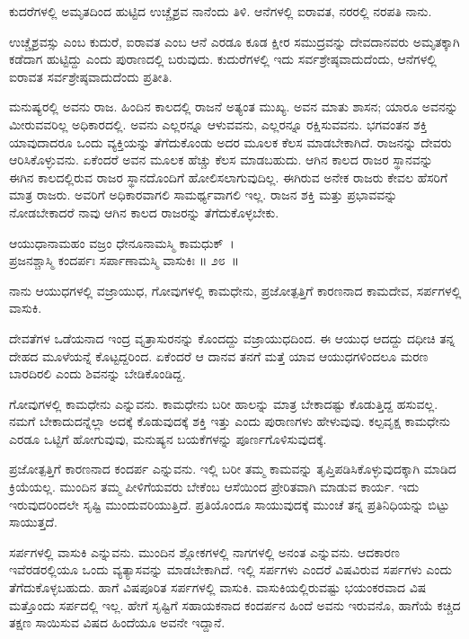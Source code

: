 \begin{artha}
ಕುದರೆಗಳಲ್ಲಿ ಅಮೃತದಿಂದ ಹುಟ್ಟಿದ ಉಚ್ಚೈಶ್ರವ ನಾನೆಂದು ತಿಳಿ. ಆನೆಗಳಲ್ಲಿ ಐರಾವತ, ನರರಲ್ಲಿ ನರಪತಿ ನಾನು.
\end{artha}

ಉಚ್ಚೈಶ್ರವಸ್ಸು ಎಂಬ ಕುದುರೆ, ಐರಾವತ ಎಂಬ ಆನೆ ಎರಡೂ ಕೂಡ ಕ್ಷೀರ ಸಮುದ್ರವನ್ನು ದೇವದಾನವರು ಅಮೃತಕ್ಕಾಗಿ ಕಡೆದಾಗ ಹುಟ್ಟಿದ್ದು ಎಂದು ಪುರಾಣದಲ್ಲಿ ಬರುವುದು. ಕುದುರೆಗಳಲ್ಲಿ ಇದು ಸರ್ವಶ್ರೇಷ್ಠವಾದುದೆಂದು, ಆನೆಗಳಲ್ಲಿ ಐರಾವತ ಸರ್ವಶ್ರೇಷ್ಠವಾದುದೆಂದು ಪ್ರತೀತಿ.

ಮನುಷ್ಯರಲ್ಲಿ ಅವನು ರಾಜ. ಹಿಂದಿನ ಕಾಲದಲ್ಲಿ ರಾಜನೆ ಅತ್ಯಂತ ಮುಖ್ಯ. ಅವನ ಮಾತು ಶಾಸನ; ಯಾರೂ ಅವನನ್ನು ಮೀರುವವರಿಲ್ಲ ಅಧಿಕಾರದಲ್ಲಿ. ಅವನು ಎಲ್ಲರನ್ನೂ ಆಳುವವನು, ಎಲ್ಲರನ್ನೂ ರಕ್ಷಿಸುವವನು. ಭಗವಂತನ ಶಕ್ತಿ ಯಾವುದಾದರೂ ಒಂದು ವ್ಯಕ್ತಿಯನ್ನು ತೆಗೆದುಕೊಂಡು ಅದರ ಮೂಲಕ ಕೆಲಸ ಮಾಡಬೇಕಾಗಿದೆ. ರಾಜನನ್ನು ದೇವರು ಆರಿಸಿಕೊಳ್ಳುವನು. ಏಕೆಂದರೆ ಅವನ ಮೂಲಕ ಹೆಚ್ಚು ಕೆಲಸ ಮಾಡಬಹುದು. ಆಗಿನ ಕಾಲದ ರಾಜರ ಸ್ಥಾನವನ್ನು ಈಗಿನ ಕಾಲದಲ್ಲಿರುವ ರಾಜರ ಸ್ಥಾನದೊಂದಿಗೆ ಹೋಲಿಸಲಾಗುವುದಿಲ್ಲ. ಈಗಿರುವ ಅನೇಕ ರಾಜರು ಕೇವಲ ಹೆಸರಿಗೆ ಮಾತ್ರ ರಾಜರು. ಅವರಿಗೆ ಅಧಿಕಾರವಾಗಲಿ ಸಾಮರ್ಥ್ಯವಾಗಲಿ ಇಲ್ಲ. ರಾಜನ ಶಕ್ತಿ ಮತ್ತು ಪ್ರಭಾವವನ್ನು ನೋಡಬೇಕಾದರೆ ನಾವು ಆಗಿನ ಕಾಲದ ರಾಜರನ್ನು ತೆಗೆದುಕೊಳ್ಳಬೇಕು.

\begin{shloka}
ಆಯುಧಾನಾಮಹಂ ವಜ್ರಂ ಧೇನೂನಾಮಸ್ಮಿ ಕಾಮಧುಕ್~।\\ಪ್ರಜನಶ್ಚಾಸ್ಮಿ ಕಂದರ್ಪಃ ಸರ್ಪಾಣಾಮಸ್ಮಿ ವಾಸುಕಿಃ \hfill॥ ೨೮~॥
\end{shloka}

\begin{artha}
ನಾನು ಆಯುಧಗಳಲ್ಲಿ ವಜ್ರಾಯುಧ, ಗೋವುಗಳಲ್ಲಿ ಕಾಮಧೇನು, ಪ್ರಜೋತ್ಪತ್ತಿಗೆ ಕಾರಣನಾದ ಕಾಮದೇವ, ಸರ್ಪಗಳಲ್ಲಿ ವಾಸುಕಿ.
\end{artha}

ದೇವತೆಗಳ ಒಡೆಯನಾದ ಇಂದ್ರ ವೃತ್ರಾಸುರನನ್ನು ಕೊಂದದ್ದು ವಜ್ರಾಯುಧದಿಂದ. ಈ ಆಯುಧ ಆದದ್ದು ದಧೀಚಿ ತನ್ನ ದೇಹದ ಮೂಳೆಯನ್ನೆ ಕೊಟ್ಟದ್ದರಿಂದ. ಏಕೆಂದರೆ ಆ ದಾನವ ತನಗೆ ಮತ್ತೆ ಯಾವ ಆಯುಧಗಳಿಂದಲೂ ಮರಣ ಬಾರದಿರಲಿ ಎಂದು ಶಿವನನ್ನು ಬೇಡಿಕೊಂಡಿದ್ದ.

ಗೋವುಗಳಲ್ಲಿ ಕಾಮಧೇನು ಎನ್ನುವನು. ಕಾಮಧೇನು ಬರೀ ಹಾಲನ್ನು ಮಾತ್ರ ಬೇಕಾದಷ್ಟು ಕೊಡುತ್ತಿದ್ದ ಹಸುವಲ್ಲ. ನಮಗೆ ಬೇಕಾದುದನ್ನೆಲ್ಲಾ ಅದಕ್ಕೆ ಕೊಡುವುದಕ್ಕೆ ಶಕ್ತಿ ಇತ್ತು ಎಂದು ಪುರಾಣಗಳು ಹೇಳುವುವು. ಕಲ್ಪವೃಕ್ಷ ಕಾಮಧೇನು ಎರಡೂ ಒಟ್ಟಿಗೆ ಹೋಗುವುವು, ಮನುಷ್ಯನ ಬಯಕೆಗಳನ್ನು ಪೂರ್ಣಗೊಳಿಸುವುದಕ್ಕೆ.

ಪ್ರಜೋತ್ಪತ್ತಿಗೆ ಕಾರಣನಾದ ಕಂದರ್ಪ ಎನ್ನುವನು. ಇಲ್ಲಿ ಬರೀ ತಮ್ಮ ಕಾಮವನ್ನು ತೃಪ್ತಿಪಡಿಸಿಕೊಳ್ಳುವುದಕ್ಕಾಗಿ ಮಾಡಿದ ಕ್ರಿಯೆಯಲ್ಲ. ಮುಂದಿನ ತಮ್ಮ ಪೀಳಿಗೆಯವರು ಬೇಕೆಂಬ ಆಸೆಯಿಂದ ಪ್ರೇರಿತವಾಗಿ ಮಾಡುವ ಕಾರ್ಯ. ಇದು ಇರುವುದರಿಂದಲೇ ಸೃಷ್ಟಿ ಮುಂದುವರಿ\-ಯುತ್ತಿದೆ. ಪ್ರತಿಯೊಂದೂ ಸಾಯುವುದಕ್ಕೆ ಮುಂಚೆ ತನ್ನ ಪ್ರತಿನಿಧಿಯನ್ನು ಬಿಟ್ಟು ಸಾಯುತ್ತದೆ.

ಸರ್ಪಗಳಲ್ಲಿ ವಾಸುಕಿ ಎನ್ನುವನು. ಮುಂದಿನ ಶ್ಲೋಕಗಳಲ್ಲಿ ನಾಗಗಳಲ್ಲಿ ಅನಂತ ಎನ್ನುವನು. ಆದಕಾರಣ ಇವೆರಡರಲ್ಲಿಯೂ ಒಂದು ವ್ಯತ್ಯಾಸವನ್ನು ಮಾಡಬೇಕಾಗಿದೆ. ಇಲ್ಲಿ ಸರ್ಪಗಳು ಎಂದರೆ ವಿಷವಿರುವ ಸರ್ಪಗಳು ಎಂದು ತೆಗೆದುಕೊಳ್ಳಬಹುದು. ಹಾಗೆ ವಿಷಪೂರಿತ ಸರ್ಪಗಳಲ್ಲಿ ವಾಸುಕಿ. ವಾಸುಕಿಯಲ್ಲಿರುವಷ್ಟು ಭಯಂಕರವಾದ ವಿಷ ಮತ್ತೊಂದು ಸರ್ಪದಲ್ಲಿ ಇಲ್ಲ. ಹೇಗೆ ಸೃಷ್ಟಿಗೆ ಸಹಾಯಕನಾದ ಕಂದರ್ಪನ ಹಿಂದೆ ಅವನು ಇರುವನೊ, ಹಾಗೆಯೆ ಕಚ್ಚಿದ ತಕ್ಷಣ ಸಾಯಿಸುವ ವಿಷದ ಹಿಂದೆಯೂ ಅವನೇ ಇದ್ದಾನೆ.

